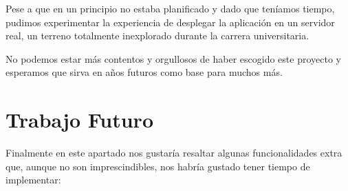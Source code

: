     Pese a que en un principio no estaba planificado y dado que teníamos tiempo, pudimos experimentar la experiencia de desplegar la aplicación en un servidor real, un terreno totalmente inexplorado durante la carrera universitaria.
    \newline
    
    No podemos estar más contentos y orgullosos de haber escogido este proyecto y esperamos que sirva en años futuros como base para muchos más. \newpage
    
     \section{Trabajo Futuro}
     
      Finalmente en este apartado nos gustaría resaltar algunas funcionalidades extra que, aunque no son imprescindibles, nos habría gustado tener tiempo de implementar:
 \newline
 
